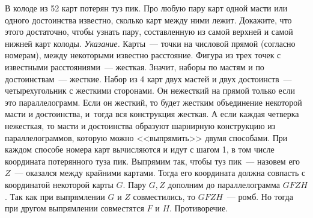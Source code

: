 \problem
В колоде из 52 карт потерян туз пик.
Про любую пару карт одной масти или одного достоинства известно, сколько карт
между ними лежит.
Докажите, что этого достаточно, чтобы узнать пару, составленную из самой
верхней и самой нижней карт колоды.
\solution
\emph{Указание.}
Карты~--- точки на числовой прямой (согласно номерам), между некоторыми
известно расстояние.
Фигура из трех точек с известными расстояниями~--- жесткая.
Значит, наборы по мастям и по достоинствам~--- жесткие.
Набор из 4 карт двух мастей и двух достоинств~--- четырехугольник с жесткими
сторонами.
Он нежесткий на прямой только если это параллелограмм.
Если он жесткий, то будет жестким объединение некоторой масти и достоинства,
и~тогда вся конструкция жесткая.
А если каждая четверка нежесткая, то масти и достоинства образуют шарнирную
конструкцию из параллелограммов, которую можно <<выпрямить>> двумя способами.
При каждом способе номера карт вычисляются и идут с шагом 1, в том числе
координата потерянного туза пик.
Выпрямим так, чтобы туз пик~--- назовем его $Z$~--- оказался между крайними
картами.
Тогда его координата должна совпасть с координатой некоторой карты $G$.
Пару $G,Z$ дополним до параллелограмма $GFZH$.
Так как при выпрямлении $G$ и $Z$ совместились, то $GFZH$~--- ромб.
Но тогда при другом выпрямлении совместятся $F$ и $H$.
Противоречие.
\endproblem
